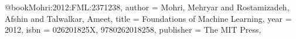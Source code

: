 @book{Mohri:2012:FML:2371238,
 author = {Mohri, Mehryar and Rostamizadeh, Afshin and Talwalkar, Ameet},
 title = {Foundations of Machine Learning},
 year = {2012},
 isbn = {026201825X, 9780262018258},
 publisher = {The MIT Press},
} 